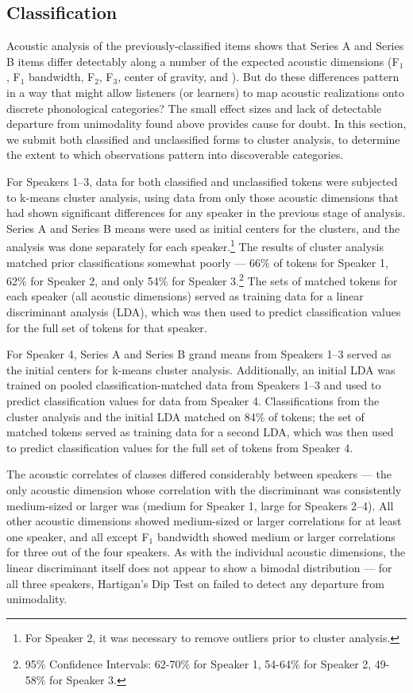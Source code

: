 \documentclass[output=paper
,newtxmath
,modfonts
,nonflat]{langsci/langscibook}
\begin{document}
\subsection{Classification}
\label{classification}

Acoustic analysis of the previously-classified items shows that Series A and Series B items differ detectably along a number of the expected acoustic dimensions (F$_1$, F$_1$ bandwidth, F$_2$, F$_3$, center of gravity, and ).  But do these differences pattern in a way that might allow listeners (or learners) to map acoustic realizations onto discrete phonological categories?  The small effect sizes and lack of detectable departure from unimodality found above provides cause for doubt.  In this section, we submit both classified and unclassified forms to cluster analysis, to determine the extent to which observations pattern into discoverable categories.

For Speakers 1--3, data for both classified and unclassified tokens were subjected to k-means cluster analysis, using data from only those acoustic dimensions that had shown significant differences for any speaker in the previous stage of analysis.  Series A and Series B means were used as initial centers for the clusters, and the analysis was done separately for each speaker.\footnote{For Speaker 2, it was necessary to remove outliers prior to cluster analysis.} The results of cluster analysis matched prior classifications somewhat poorly --- 66\% of tokens for Speaker 1, 62\% for Speaker 2, and only 54\% for Speaker 3.\footnote{95\% Confidence Intervals: 62-70\% for Speaker 1, 54-64\% for Speaker 2, 49-58\% for Speaker 3.}  The sets of matched tokens for each speaker (all acoustic dimensions) served as training data for a linear discriminant analysis (LDA), which was then used to predict classification values for the full set of tokens for that speaker.

For Speaker 4, Series A and Series B grand means from Speakers 1--3 served as the initial centers for k-means cluster analysis.  Additionally, an initial LDA was trained on pooled classification-matched data from Speakers 1--3 and used to predict classification values for data from Speaker 4.  Classifications from the cluster analysis and the initial LDA matched on 84\% of tokens; the set of matched tokens served as training data for a second LDA, which was then used to predict classification values for the full set of tokens from Speaker 4.

The acoustic correlates of classes differed considerably between speakers --- the only acoustic dimension whose correlation with the discriminant was consistently medium-sized or larger was  (medium for Speaker 1, large for Speakers 2--4).  All other acoustic dimensions showed medium-sized or larger correlations for at least one speaker, and all except F$_1$ bandwidth showed medium or larger correlations for three out of the four speakers.  As with the individual acoustic dimensions, the linear discriminant itself does not appear to show a bimodal distribution --- for all three speakers, Hartigan's Dip Test on failed to detect any departure from unimodality.
\end{document}
